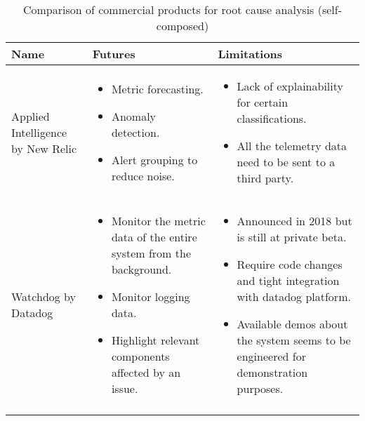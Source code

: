 \begin{longtable}{| p{40mm} | p{55mm} | p{55mm} |}
\hline
  \textbf{Name} &
  \textbf{Futures} &
  \textbf{Limitations} \\ \hline
  Applied Intelligence by New Relic &
  \vspace{-8mm}
  \begin{itemize}[leftmargin=*,noitemsep,nolistsep] 
    \item Metric forecasting.
    \item Anomaly detection.
    \item Alert grouping to reduce noise.
  \vspace{-7mm}
  \end{itemize} &
  \vspace{-8mm}
  \begin{itemize}[leftmargin=*,noitemsep,nolistsep] 
    \item Lack of explainability for certain classifications.
    \item All the telemetry data need to be sent to a third party.
  \vspace{-7mm}
  \end{itemize} \\ \hline
  Watchdog by Datadog &
  \vspace{-8mm}
  \begin{itemize}[leftmargin=*,noitemsep,nolistsep] 
    \item Monitor the metric data of the entire system from the background.
    \item Monitor logging data.
    \item Highlight relevant components affected by an issue.
  \vspace{-7mm}
  \end{itemize} &
  \vspace{-8mm}
  \begin{itemize}[leftmargin=*,noitemsep,nolistsep] 
    \item Announced in 2018 but is still at private beta.
    \item Require code changes and tight integration with datadog platform.
    \item Available demos about the system seems to be engineered for demonstration purposes.
  \vspace{-7mm}
  \end{itemize} \\ \hline
  \caption{Comparison of commercial products for root cause analysis (self-composed)}
\end{longtable}